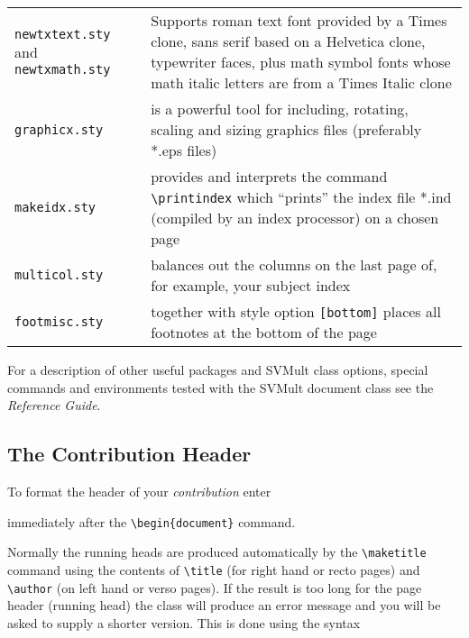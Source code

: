 \documentclass[graybox]{svmult}
\begin{document}
\begin{refguide}
\begin{sloppy}
\begin{tabular}{p{7.5pc}@{\qquad}p{18.5pc}}
{\tt newtxtext.sty} and {\tt newtxmath.sty} & Supports roman text font provided by a Times clone,  sans serif based on a Helvetica clone,  typewriter faces,  plus math symbol fonts whose math italic letters are from a Times Italic clone\\
{\tt graphicx.sty} & is a powerful tool for including, rotating, scaling and sizing graphics files (preferably *.eps files) \\
{\tt makeidx.sty} & provides and interprets the command \verb|\printindex| which ``prints'' the index file *.ind (compiled by an index processor) on a chosen page \\
{\tt multicol.sty} & balances out the columns on the last page of, for exam­ple, your subject index \\
{\tt footmisc.sty} & together with style option {\tt [bottom]} places all footnotes at the bottom of the page
\end{tabular}

For a description of other useful packages and {\sc SVMult} class options, special commands and environments tested with the {\sc SVMult} document class see the {\it Reference Guide}.

\subsection{The Contribution Header}
To format the header of your {\it contribution} enter

\vspace*{-6pt}

\cprotect{}


immediately after the \verb|\begin{document}| command.

Normally the running heads are produced automatically by the \verb|\maketitle| command using the contents of \verb|\title| (for right hand or recto pages) and \verb|\author| (on left hand or verso pages). If the result is too long for the page header (running head) the class will produce an error message and you will be asked to supply a shorter version. This is done using the syntax


\end{sloppy}
\end{refguide}
\end{document}
